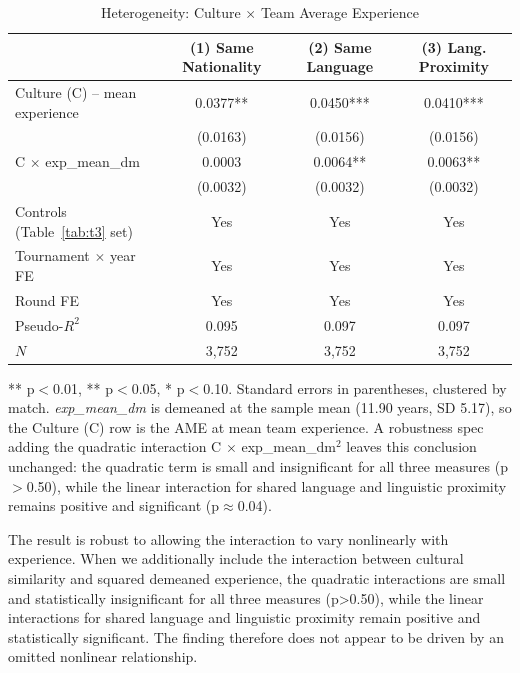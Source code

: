 \documentclass[10pt]{article}
\begin{document}
\begin{table}[htbp]
\color{blue}
\centering
\caption{Heterogeneity: Culture $\times$ Team Average Experience \label{tab:t6}}
\begin{threeparttable}
\begin{tabular}{lccc}
\toprule
 & (1) Same Nationality & (2) Same Language & (3) Lang. Proximity \\
\midrule
Culture (C) -- mean experience & 0.0377** & 0.0450*** & 0.0410*** \\
 & (0.0163) & (0.0156) & (0.0156) \\
C $\times$ exp\_mean\_dm & 0.0003 & 0.0064** & 0.0063** \\
 & (0.0032) & (0.0032) & (0.0032) \\
\midrule
Controls (Table~\ref{tab:t3} set) & Yes & Yes & Yes \\
Tournament $\times$ year FE & Yes & Yes & Yes \\
Round FE & Yes & Yes & Yes \\
Pseudo-$R^2$ & 0.095 & 0.097 & 0.097 \\
$N$ & 3,752 & 3,752 & 3,752 \\
\bottomrule
\end{tabular}
\begin{tablenotes}
\small
\item *** p$<$0.01, ** p$<$0.05, * p$<$0.10. Standard errors in parentheses, clustered by match. \textit{exp\_mean\_dm} is demeaned at the sample mean (11.90 years, SD 5.17), so the Culture (C) row is the AME at mean team experience. A robustness spec adding the quadratic interaction C $\times$ exp\_mean\_dm$^2$ leaves this conclusion unchanged: the quadratic term is small and insignificant for all three measures (p$>$0.50), while the linear interaction for shared language and linguistic proximity remains positive and significant (p$\approx$0.04).
\end{tablenotes}
\end{threeparttable}
\end{table}
\FloatBarrier

The result is robust to allowing the interaction to vary nonlinearly with experience. When we additionally include the interaction between cultural similarity and squared demeaned experience, the quadratic interactions are small and statistically insignificant for all three measures (p>0.50), while the linear interactions for shared language and linguistic proximity remain positive and statistically significant. The finding therefore does not appear to be driven by an omitted nonlinear relationship.
\end{document}
